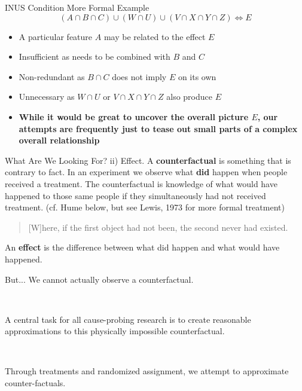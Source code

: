 \documentclass{beamer}
\begin{document}
\begin{frame}{INUS Condition More Formal Example}
$$ \left(A \cap B \cap C\right)  \cup \left(W \cap  U\right) \cup \left(V\cap X \cap Y \cap Z\right)\Leftrightarrow E $$
\begin{itemize}
	\item A particular feature $A$ may be related to the effect $E$
	\item Insufficient as needs to be combined with $B$ and $C$
	\item Non-redundant as $B \cap C$ does not imply $E$ on its own
	\item Unnecessary as $W \cap U$ or $V\cap X \cap Y \cap Z$ also produce $E$ \pause
	
	\item \textbf{While it would be great to uncover the overall picture $E$, our attempts are frequently just to tease out small parts of a complex overall relationship}
\end{itemize}
\end{frame}


\begin{frame}{What Are We Looking For? ii) Effect.}\pause
A \textbf{counterfactual} is something that is contrary to fact. In an
experiment we observe what \textbf{did} happen when people received a treatment. The
counterfactual is knowledge of what would have happened to those same people
if they simultaneously had not received treatment. (cf. Hume below, but see Lewis, 1973 for more formal treatment)

\begin{quotation}
[W]here, if the first object had not been, the second never had existed.
\end{quotation}\pause

An \textbf{effect} is the difference between what did happen and what would
have happened.
\end{frame}

\begin{frame}{But...}
We cannot actually observe a counterfactual.\pause

\

A central task for all cause-probing research is to create reasonable
approximations to this physically impossible counterfactual.\pause

\

Through treatments and randomized assignment, we attempt to approximate counter-factuals.
\end{frame}
\end{document}

